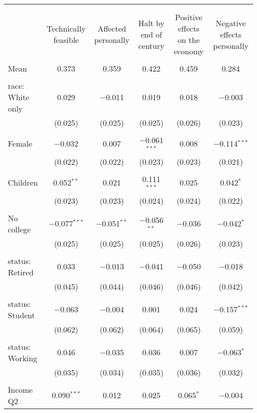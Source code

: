 
\begin{tabular}{@{\extracolsep{5pt}}lccccc} 
\\[-1.8ex]\hline 
\hline \\[-1.8ex] 
\\[-1.8ex] & Technically feasible & Affected personally & Halt by end of century & Positive effects on the economy & Negative effects personally \\ 
\hline \\[-1.8ex] 
 Mean & 0.373 & 0.359 & 0.422 & 0.459 & 0.284  \\ \hline \\[-1.8ex] race: White only & 0.029 & $-$0.011 & 0.019 & 0.018 & $-$0.003 \\ 
  & (0.025) & (0.025) & (0.025) & (0.026) & (0.023) \\ 
  & & & & & \\ 
 Female & $-$0.032 & 0.007 & $-$0.061$^{***}$ & 0.008 & $-$0.114$^{***}$ \\ 
  & (0.022) & (0.022) & (0.023) & (0.023) & (0.021) \\ 
  & & & & & \\ 
 Children & 0.052$^{**}$ & 0.021 & 0.111$^{***}$ & 0.025 & 0.042$^{*}$ \\ 
  & (0.023) & (0.023) & (0.024) & (0.024) & (0.022) \\ 
  & & & & & \\ 
 No college & $-$0.077$^{***}$ & $-$0.051$^{**}$ & $-$0.056$^{**}$ & $-$0.036 & $-$0.042$^{*}$ \\ 
  & (0.025) & (0.025) & (0.025) & (0.026) & (0.023) \\ 
  & & & & & \\ 
 status: Retired & 0.033 & $-$0.013 & $-$0.041 & $-$0.050 & $-$0.018 \\ 
  & (0.045) & (0.044) & (0.046) & (0.046) & (0.042) \\ 
  & & & & & \\ 
 status: Student & $-$0.063 & $-$0.004 & 0.001 & 0.024 & $-$0.157$^{***}$ \\ 
  & (0.062) & (0.062) & (0.064) & (0.065) & (0.059) \\ 
  & & & & & \\ 
 status: Working & 0.046 & $-$0.035 & 0.036 & 0.007 & $-$0.063$^{*}$ \\ 
  & (0.035) & (0.034) & (0.035) & (0.036) & (0.032) \\ 
  & & & & & \\ 
 Income Q2 & 0.090$^{***}$ & 0.012 & 0.025 & 0.065$^{*}$ & $-$0.004 \\ 

\end{tabular}

